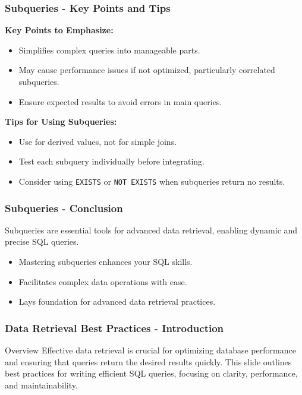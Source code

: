 \documentclass[aspectratio=169]{beamer}
\begin{document}
\begin{frame}[fragile]
    \frametitle{Subqueries - Key Points and Tips}
    \textbf{Key Points to Emphasize:}
    \begin{itemize}
        \item Simplifies complex queries into manageable parts.
        \item May cause performance issues if not optimized, particularly correlated subqueries.
        \item Ensure expected results to avoid errors in main queries.
    \end{itemize}

    \textbf{Tips for Using Subqueries:}
    \begin{itemize}
        \item Use for derived values, not for simple joins.
        \item Test each subquery individually before integrating.
        \item Consider using \texttt{EXISTS} or \texttt{NOT EXISTS} when subqueries return no results.
    \end{itemize}
\end{frame}

\begin{frame}[fragile]
    \frametitle{Subqueries - Conclusion}
    Subqueries are essential tools for advanced data retrieval, enabling dynamic and precise SQL queries. 
    \begin{itemize}
        \item Mastering subqueries enhances your SQL skills.
        \item Facilitates complex data operations with ease.
        \item Lays foundation for advanced data retrieval practices.
    \end{itemize}
\end{frame}

\begin{frame}[fragile]
    \frametitle{Data Retrieval Best Practices - Introduction}
    \begin{block}{Overview}
        Effective data retrieval is crucial for optimizing database performance and ensuring that queries return the desired results quickly. This slide outlines best practices for writing efficient SQL queries, focusing on clarity, performance, and maintainability.
    \end{block}
\end{frame}
\end{document}
